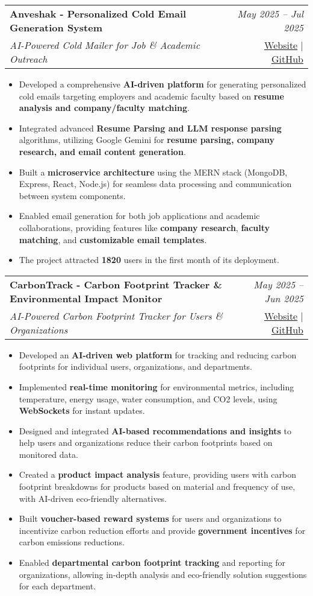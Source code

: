\documentclass[a4paper,11pt]{article}
\makeatletter
\newcommand{\resumeProject}[4]{
\vspace{0.5mm}\item
    \begin{tabular*}{0.98\textwidth}[t]{l@{\extracolsep{\fill}}r}
        \textbf{#1} & \textit{\footnotesize{#3}} \\
        \footnotesize{\textit{#2}} & \footnotesize{#4}
    \end{tabular*}
    \vspace{-2.4mm}
}
\newcommand{\resumeItemListStart}{\begin{itemize}[leftmargin=*,labelsep=1mm,itemsep=0.5mm]}
\newcommand{\resumeItemListEnd}{\end{itemize}\vspace{-2mm}}
\makeatother
\begin{document}
\resumeProject
    {Anveshak - Personalized Cold Email Generation System}
    {AI-Powered Cold Mailer for Job \& Academic Outreach}
    {May 2025 -- Jul 2025}
    {\href{https://anveshak.vercel.app/}{Website} | \href{https://github.com/THE-DEEPDAS/Anveshak}{GitHub}}

\resumeItemListStart
    \item Developed a comprehensive \textbf{AI-driven platform} for generating personalized cold emails targeting employers and academic faculty based on \textbf{resume analysis and company/faculty matching}.
    \item Integrated advanced \textbf{Resume Parsing and LLM response parsing} algorithms, utilizing Google Gemini for \textbf{resume parsing, company research, and email content generation}.
    \item Built a \textbf{microservice architecture} using the MERN stack (MongoDB, Express, React, Node.js) for seamless data processing and communication between system components.
    \item Enabled email generation for both job applications and academic collaborations, providing features like \textbf{company research}, \textbf{faculty matching}, and \textbf{customizable email templates}.
    \item The project attracted \textbf{1820} users in the first month of its deployment.
\resumeItemListEnd

\resumeProject
    {CarbonTrack - Carbon Footprint Tracker \& Environmental Impact Monitor}
    {AI-Powered Carbon Footprint Tracker for Users \& Organizations}
    {May 2025 -- Jun 2025}
    {\href{https://carbontrack-one.vercel.app/}{Website} | \href{https://github.com/THE-DEEPDAS/carbontrack_1}{GitHub}}

\resumeItemListStart
    \item Developed an \textbf{AI-driven web platform} for tracking and reducing carbon footprints for individual users, organizations, and departments.
    \item Implemented \textbf{real-time monitoring} for environmental metrics, including temperature, energy usage, water consumption, and CO2 levels, using \textbf{WebSockets} for instant updates.
    \item Designed and integrated \textbf{AI-based recommendations and insights} to help users and organizations reduce their carbon footprints based on monitored data.
    \item Created a \textbf{product impact analysis} feature, providing users with carbon footprint breakdowns for products based on material and frequency of use, with AI-driven eco-friendly alternatives.
    \item Built \textbf{voucher-based reward systems} for users and organizations to incentivize carbon reduction efforts and provide \textbf{government incentives} for carbon emissions reductions.
    \item Enabled \textbf{departmental carbon footprint tracking} and reporting for organizations, allowing in-depth analysis and eco-friendly solution suggestions for each department.
\resumeItemListEnd
\end{document}
